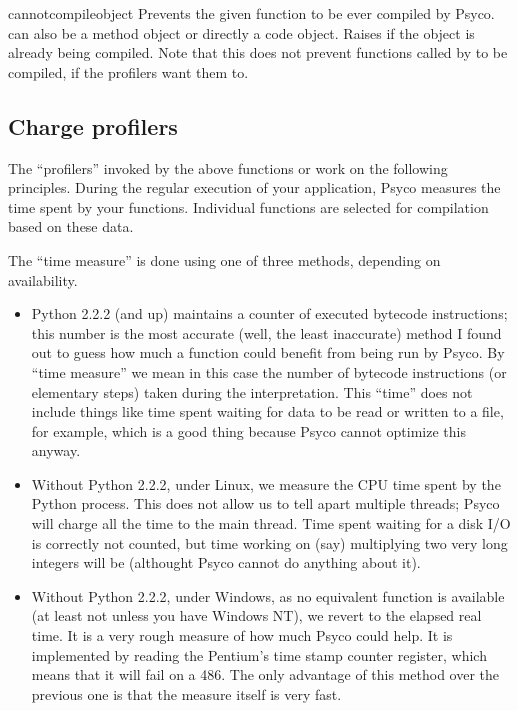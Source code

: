 \documentclass{manual}
\begin{document}
\begin{funcdesc}{cannotcompile}{object}
  Prevents the given function to be ever compiled by Psyco.   can also be a method object or directly a code object.  Raises  if the object is already being compiled.  Note that this does not prevent functions called by  to be compiled, if the profilers want them to.
\end{funcdesc}



\subsection{Charge profilers}\label{charges}

The ``profilers'' invoked by the above functions  or  work on the following principles.  During the regular execution of your application, Psyco measures the time spent by your functions.  Individual functions are selected for compilation based on these data.

The ``time measure'' is done using one of three methods, depending on availability.

\begin{itemize}
  
\item Python 2.2.2 (and up) maintains a counter of executed bytecode instructions; this number is the most accurate (well, the least inaccurate) method I found out to guess how much a function could benefit from being run by Psyco.  By ``time measure'' we mean in this case the number of bytecode instructions (or elementary steps) taken during the interpretation.  This ``time'' does not include things like time spent waiting for data to be read or written to a file, for example, which is a good thing because Psyco cannot optimize this anyway.

\item Without Python 2.2.2, under Linux, we measure the CPU time spent by the Python process.  This does not allow us to tell apart multiple threads; Psyco will charge all the time to the main thread.  Time spent waiting for a disk I/O is correctly not counted, but time working on (say) multiplying two very long integers will be (althought Psyco cannot do anything about it).
  
\item Without Python 2.2.2, under Windows, as no equivalent function is available (at least not unless you have Windows NT), we revert to the elapsed real time.  It is a very rough measure of how much Psyco could help.  It is implemented by reading the Pentium's time stamp counter register, which means that it will fail on a 486.  The only advantage of this method over the previous one is that the measure itself is very fast.

\end{itemize}
\end{document}
